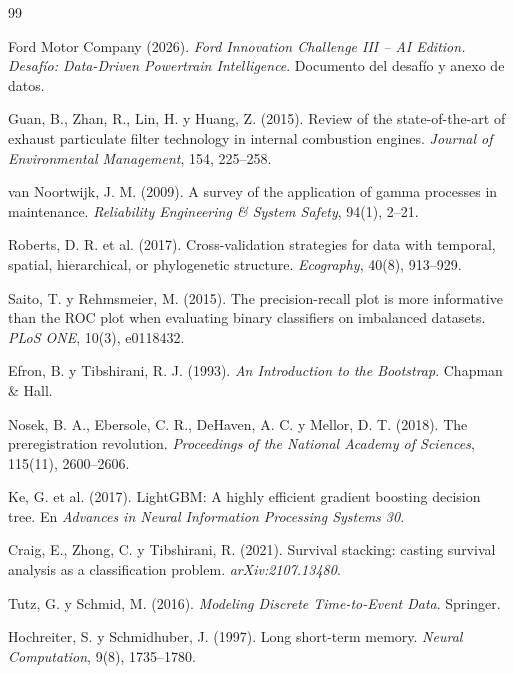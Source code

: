 \begin{thebibliography}{99}
\setlength{\itemsep}{2pt}

 Ford Motor Company (2026). \textit{Ford Innovation Challenge III -- AI Edition. Desafío: Data-Driven
  Powertrain Intelligence}. Documento del desafío y anexo de datos.

 Guan, B., Zhan, R., Lin, H. y Huang, Z. (2015). Review of the state-of-the-art of exhaust particulate
  filter technology in internal combustion engines. \textit{Journal of Environmental Management}, 154, 225--258.

 van Noortwijk, J. M. (2009). A survey of the application of gamma processes in maintenance.
  \textit{Reliability Engineering \& System Safety}, 94(1), 2--21.

 Roberts, D. R. et al. (2017). Cross-validation strategies for data with temporal, spatial,
  hierarchical, or phylogenetic structure. \textit{Ecography}, 40(8), 913--929.

 Saito, T. y Rehmsmeier, M. (2015). The precision-recall plot is more informative than the ROC plot when
  evaluating binary classifiers on imbalanced datasets. \textit{PLoS ONE}, 10(3), e0118432.

 Efron, B. y Tibshirani, R. J. (1993). \textit{An Introduction to the Bootstrap}. Chapman \& Hall.

 Nosek, B. A., Ebersole, C. R., DeHaven, A. C. y Mellor, D. T. (2018). The preregistration revolution.
  \textit{Proceedings of the National Academy of Sciences}, 115(11), 2600--2606.

 Ke, G. et al. (2017). LightGBM: A highly efficient gradient boosting decision tree. En \textit{Advances in
  Neural Information Processing Systems 30}.

 Craig, E., Zhong, C. y Tibshirani, R. (2021). Survival stacking: casting survival analysis as a
  classification problem. \textit{arXiv:2107.13480}.

 Tutz, G. y Schmid, M. (2016). \textit{Modeling Discrete Time-to-Event Data}. Springer.

 Hochreiter, S. y Schmidhuber, J. (1997). Long short-term memory. \textit{Neural Computation}, 9(8),
  1735--1780.


\end{thebibliography}
